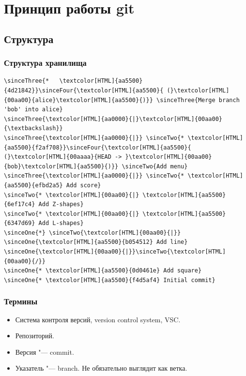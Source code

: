 \documentclass[pdf,russian]{beamer}
\begin{document}
\section{Принцип работы git}

\subsection{Структура}

\begin{frame}[fragile]
    \frametitle{Структура хранилища}
    

    \newcommand{\sinceOne}[1]{\onslide<2->{#1}}
    \newcommand{\sinceTwo}[1]{\onslide<4->{#1}}
    \newcommand{\sinceThree}[1]{\onslide<6->{#1}}
    \newcommand{\sinceFour}[1]{\onslide<8->{#1}}

    \begin{block}{}
        \begin{Verbatim}[commandchars=\\\{\}]
\sinceThree{*   \textcolor[HTML]{aa5500}{4d21842}}\sinceFour{\textcolor[HTML]{aa5500}{ (}\textcolor[HTML]{00aa00}{alice}\textcolor[HTML]{aa5500}{)}} \sinceThree{Merge branch 'bob' into alice}
\sinceThree{\textcolor[HTML]{aa0000}{|}\textcolor[HTML]{00aa00}{\textbackslash}}
\sinceThree{\textcolor[HTML]{aa0000}{|}} \sinceTwo{* \textcolor[HTML]{aa5500}{f2af708}}\sinceFour{\textcolor[HTML]{aa5500}{ (}\textcolor[HTML]{00aaaa}{HEAD -> }\textcolor[HTML]{00aa00}{bob}\textcolor[HTML]{aa5500}{)}} \sinceTwo{Add menu}
\sinceThree{\textcolor[HTML]{aa0000}{|}} \sinceTwo{* \textcolor[HTML]{aa5500}{efbd2a5} Add score}
\sinceTwo{* \textcolor[HTML]{00aa00}{|} \textcolor[HTML]{aa5500}{6ef17c4} Add Z-shapes}
\sinceTwo{* \textcolor[HTML]{00aa00}{|} \textcolor[HTML]{aa5500}{6347d69} Add L-shapes}
\sinceOne{*} \sinceTwo{\textcolor[HTML]{00aa00}{|}} \sinceOne{\textcolor[HTML]{aa5500}{b054512} Add line}
\sinceOne{\textcolor[HTML]{00aa00}{|}}\sinceTwo{\textcolor[HTML]{00aa00}{/}}
\sinceOne{* \textcolor[HTML]{aa5500}{0d0461e} Add square}
\sinceOne{* \textcolor[HTML]{aa5500}{f4d5af4} Initial commit}
        \end{Verbatim}
    \end{block}
\end{frame}

\begin{frame}
    \frametitle{Термины}
    \begin{itemize}
        \pause
        \item Система контроля версий, version control system, VSC.
        \pause
        \item Репозиторий.
        \pause
        \item Версия "--- commit.
        \pause
        \item Указатель "--- branch. \pause Не обязательно выглядит как ветка.
    \end{itemize}
\end{frame}
\end{document}
